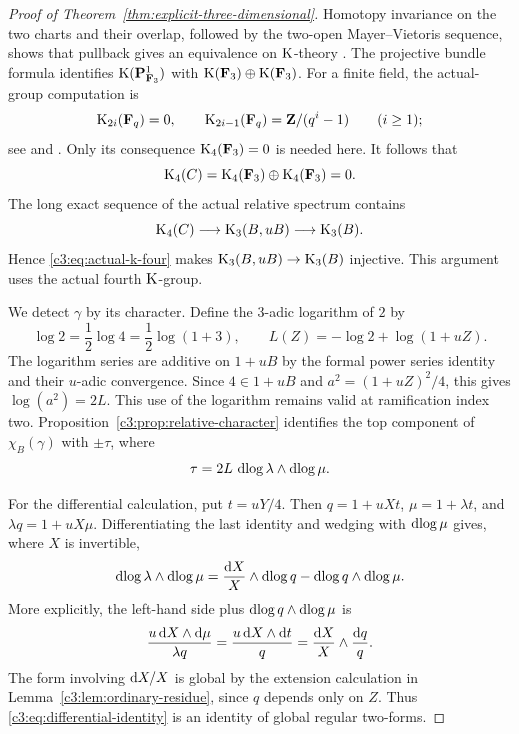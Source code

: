 \begin{proof}[Proof of Theorem~\ref{thm:explicit-three-dimensional}]
Homotopy invariance on the two charts and their overlap, followed by
the two-open Mayer--Vietoris sequence, shows that pullback gives an
equivalence on $\operatorname{K}$-theory
\cite[\S7, Remark~3.5 and Proposition~4.1]{Quillen}.
The projective bundle formula
\cite[\S8, Theorem~2.1]{Quillen} identifies
$\operatorname{K}(\mathbf{P}^1_{\mathbf{F}_3})$ with $\operatorname{K}(\mathbf{F}_3)\oplus\operatorname{K}(\mathbf{F}_3)$.
For a finite field, the actual-group computation is
\[
 \operatorname{K}_{2i}(\mathbf{F}_q)=0,\qquad
 \operatorname{K}_{2i-1}(\mathbf{F}_q)=\mathbf{Z}/(q^i-1)
 \qquad(i\geq1);
\]
see \cite{QuillenFinite} and
\cite[IV, Theorem~1.12 and Corollary~1.13]{Weibel}.
Only its consequence $\operatorname{K}_4(\mathbf{F}_3)=0$ is needed here.
It follows that
\begin{equation}\label{c3:eq:actual-k-four}
 \operatorname{K}_4(C)=\operatorname{K}_4(\mathbf{F}_3)\oplus\operatorname{K}_4(\mathbf{F}_3)=0.
\end{equation}
The long exact sequence of the actual relative spectrum contains
\[
 \operatorname{K}_4(C)\longrightarrow\operatorname{K}_3(B,uB)\longrightarrow\operatorname{K}_3(B).
\]
Hence \eqref{c3:eq:actual-k-four} makes
$\operatorname{K}_3(B,uB)\to\operatorname{K}_3(B)$ injective.
This argument uses the actual fourth $\operatorname{K}$-group.

We detect $\gamma$ by its character.
Define the $3$-adic logarithm of $2$ by
\[
 \log2=\frac12\log4=\frac12\log(1+3),
 \qquad
 L(Z)=-\log2+\log(1+uZ).
\]
The logarithm series are additive on $1+uB$ by the formal power
series identity and their $u$-adic convergence.
Since $4\in1+uB$ and
$a^2=(1+uZ)^2/4$, this gives
$\log(a^2)=2L$.
This use of the logarithm remains valid at ramification index two.
Proposition~\ref{c3:prop:relative-character} identifies the top
component of $\chi_B(\gamma)$ with $\pm\tau$, where
\begin{equation}\label{c3:eq:character-form}
 \tau=2L\,\operatorname{dlog}\lambda\wedge\operatorname{dlog}\mu.
\end{equation}

For the differential calculation, put $t=uY/4$.
Then $q=1+uXt$, $\mu=1+\lambda t$, and
$\lambda q=1+uX\mu$.
Differentiating the last identity and wedging with $\operatorname{dlog}\mu$ gives,
where $X$ is invertible,
\begin{equation}\label{c3:eq:differential-identity}
 \operatorname{dlog}\lambda\wedge\operatorname{dlog}\mu
   =\frac{\mathrm{d} X}{X}\wedge\operatorname{dlog} q
      -\operatorname{dlog} q\wedge\operatorname{dlog}\mu.
\end{equation}
More explicitly, the left-hand side plus
$\operatorname{dlog} q\wedge\operatorname{dlog}\mu$ is
\[
 \frac{u\,\mathrm{d} X\wedge\mathrm{d}\mu}{\lambda q}
   =\frac{u\,\mathrm{d} X\wedge\mathrm{d} t}{q}
   =\frac{\mathrm{d} X}{X}\wedge\frac{\mathrm{d} q}{q}.
\]
The form involving $\mathrm{d} X/X$ is global by the extension calculation
in Lemma~\ref{c3:lem:ordinary-residue}, since $q$ depends only on $Z$.
Thus \eqref{c3:eq:differential-identity} is an identity of global regular
two-forms.


\end{proof}
